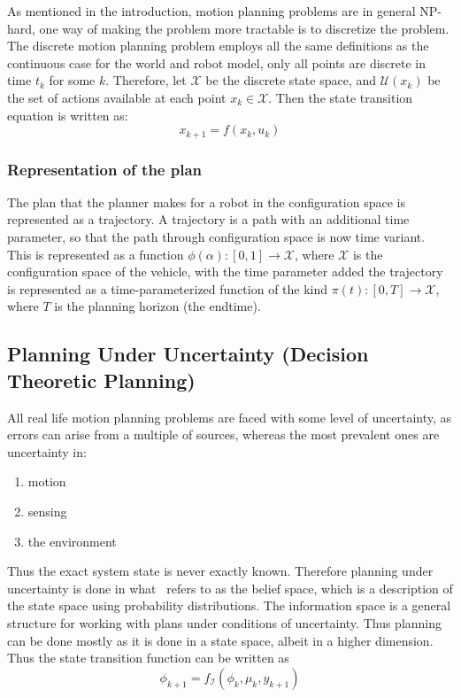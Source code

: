 As mentioned in the introduction, motion planning problems are in general
NP-hard, one way of making the problem more tractable is to discretize the
problem. The discrete motion planning problem employs all the same definitions
as the continuous case for the world and robot model, only all points are
discrete in time \(t_k\) for some \(k\). Therefore, let \(\mathcal{X}\) be the
discrete state space, and \(\mathcal{U}(x_k)\) be the set of actions available
at each point \(x_k \in \mathcal{X}\). Then the state transition equation is
written as:
\[
  x_{k+1} = f(x_k, u_k)
\]

\subsubsection{Representation of the plan}

The plan that the planner makes for a robot in the configuration space is
represented as a trajectory. A trajectory is a path with an additional time
parameter, so that the path through configuration space is now time variant.
This is represented as a function \(\phi(\alpha) \colon [0,1] \rightarrow
\mathcal{X}\), where \(\mathcal{X}\) is the configuration space of the vehicle,
with the time parameter added the trajectory is represented as a
time-parameterized function of the kind \(\pi(t) \colon [0,T] \rightarrow
\mathcal{X}\), where \(T\) is the planning horizon (\ie the endtime).

\subsection{Planning Under Uncertainty (Decision Theoretic Planning)}

All real life motion planning problems are faced with some level of uncertainty,
as errors can arise from a multiple of sources, whereas the most prevalent ones
are uncertainty in:
\begin{enumerate}
\item motion
\item sensing
\item the environment
\end{enumerate}
Thus the exact system state is never exactly known. Therefore planning under
uncertainty is done in what~\cite[LaValle]{Lav06} refers to as the belief space,
which is a description of the state space using probability distributions. The
information space is a general structure for working with plans under conditions
of uncertainty. Thus planning can be done mostly as it is done in a state space,
albeit in a higher dimension. Thus the state transition function can be written
as
\[
  \phi_{k+1} = f_{\mathcal{I}}\left( \phi_k, \mu_k, y_{k+1} \right)
\]

